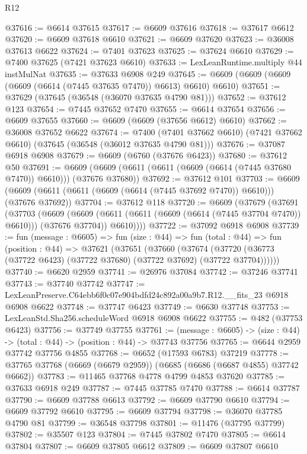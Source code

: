 \begin{lexlean}{R12}
\begin{coremodule}
@37616 := @6614 @37615
@37617 := @6609 @37616
@37618 := @37617 @6612
@37620 := @6609 @37618 @6610
@37621 := @6609 @37620
@37623 := @36008 @37613 @6622
@37624 := @7401 @37623
@37625 := @37624 @6610
@37629 := @7400 @37625 (@7421 @37623 @6610)
@37633 := LexLeanRuntime.multiply @44 instMulNat
@37635 := @37633 @6908 @249
@37645 := @6609 (@6609 (@6609 (@6609 (@6614 (@7445 @37635 @7470)) @6613) @6610) @6610)
@37651 := @37629 (@37645 (@36548 (@36070 @37635 @4790 @81)))
@37652 := @37612 @123
@37654 := @7445 @37652 @7470
@37655 := @6614 @37654
@37656 := @6609 @37655
@37660 := @6609 (@6609 (@37656 @6612) @6610)
@37662 := @36008 @37652 @6622
@37674 := @7400
    (@7401 @37662 @6610)
    (@7421 @37662 @6610)
    (@37645 (@36548 (@36012 @37635 @4790 @81)))
@37676 := @37087 @6918 @6908
@37679 := @6609 (@6760 (@37676 @6423))
@37680 := @37612 @50
@37691 := @6609 (@6609 (@6611 (@6611 (@6609 (@6614 (@7445 @37680 @7470)) @6610))) (@37676 @37680))
@37692 := @37612 @101
@37703 := @6609 (@6609 (@6611 (@6611 (@6609 (@6614 (@7445 @37692 @7470)) @6610))) (@37676 @37692))
@37704 := @37612 @118
@37720 := @6609
    (@37679
      (@37691
        (@37703
          (@6609
            (@6609 (@6611 (@6611 (@6609 (@6614 (@7445 @37704 @7470)) @6610))) (@37676 @37704))
            @6610))))
@37722 := @37092 @6918 @6908
@37739 := fun (message : @6605) =>
  fun (size : @44) =>
  fun (total : @44) =>
  fun (position : @44) =>
  @37621
    (@37651
      (@37660
        (@37674 (@37720 (@36773 (@37722 @6423) (@37722 @37680) (@37722 @37692) (@37722 @37704))))))
@37740 := @6620 @2959
@37741 := @26976 @37084
@37742 := @37246 @37741
@37743 := @37740 @37742
@37747 := LexLeanPreserve.C64ebb6f0c07e904bdfd24c892a00a9b7.R12.__fits_23 @6918 @6908 @6622
@37748 := @37747 @6423
@37749 := @6630 @37748
@37753 := LexLeanStd.Sha256.scheduleWord @6918 @6908 @6622
@37755 := @482 (@37753 @6423)
@37756 := @37749 @37755
@37761 := (message : @6605) -> (size : @44) -> (total : @44) -> (position : @44) -> @37743 @37756
@37765 := @6644 @2959 @37742 @37756 @4855
@37768 := @6652 (@17593 @6783) @37219
@37778 := @37765 @37768 (@6669 (@6679 @2959)) (@6685 (@6686 (@6687 @4855) @37742 @6662))
@37783 := @11465 @37768 @4778 @4799 @4853 @37620
@37785 := @37633 @6918 @249
@37787 := @7445 @37785 @7470
@37788 := @6614 @37787
@37790 := @6609 @37788 @6613
@37792 := @6609 @37790 @6610
@37794 := @6609 @37792 @6610
@37795 := @6609 @37794
@37798 := @36070 @37785 @4790 @81
@37799 := @36548 @37798
@37801 := @11476 (@37795 @37799)
@37802 := @35507 @123
@37804 := @7445 @37802 @7470
@37805 := @6614 @37804
@37807 := @6609 @37805 @6612
@37809 := @6609 @37807 @6610

\end{coremodule}
\end{lexlean}
